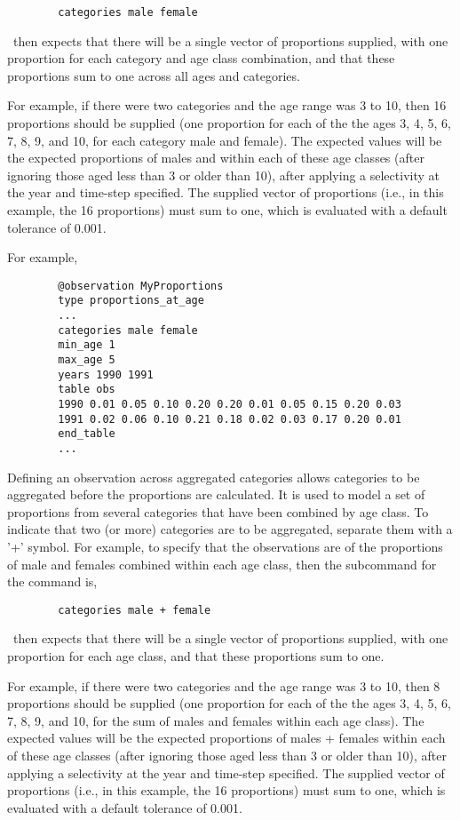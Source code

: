 {\small{\begin{verbatim}
		categories male female
		\end{verbatim}}}

\CNAME\ then expects that there will be a single vector of proportions supplied, with one proportion for each category and age class combination, and that these proportions sum to one across all ages and categories.

For example, if there were two categories and the age range was 3 to 10, then 16 proportions should be supplied (one proportion for each of the the ages 3, 4, 5, 6, 7, 8, 9, and 10, for each category male and female). The expected values will be the expected proportions of males and within each of these age classes (after ignoring those aged less than 3 or older than 10), after applying a selectivity at the year and time-step specified. The supplied vector of proportions (i.e., in this example, the 16 proportions) must sum to one, which is evaluated with a default tolerance of 0.001. 

For example,

{\small{\begin{verbatim}
		@observation MyProportions
		type proportions_at_age
		...
		categories male female
		min_age 1
		max_age 5
		years 1990 1991
		table obs
		1990 0.01 0.05 0.10 0.20 0.20 0.01 0.05 0.15 0.20 0.03
		1991 0.02 0.06 0.10 0.21 0.18 0.02 0.03 0.17 0.20 0.01
		end_table
		...
		\end{verbatim}}}
		
		
Defining an observation across aggregated categories allows categories to be aggregated before the proportions are calculated. It is used to model a set of proportions from several categories that have been combined by age class. To indicate that two (or more) categories are to be aggregated, separate them with a '+' symbol. For example, to specify that the observations are of the proportions of male and females combined within each age class, then the subcommand  for the  command is,
		
{\small{\begin{verbatim}
		categories male + female
		\end{verbatim}}}
		
\CNAME\ then expects that there will be a single vector of proportions supplied, with one proportion for each age class, and that these proportions sum to one. 
		
For example, if there were two categories and the age range was 3 to 10, then 8 proportions should be supplied (one proportion for each of the the ages 3, 4, 5, 6, 7, 8, 9, and 10, for the sum of males and females within each age class). The expected values will be the expected proportions of males + females within each of these age classes (after ignoring those aged less than 3 or older than 10), after applying a selectivity at the year and time-step specified. The supplied vector of proportions (i.e., in this example, the 16 proportions) must sum to one, which is evaluated with a default tolerance of 0.001. 
		
